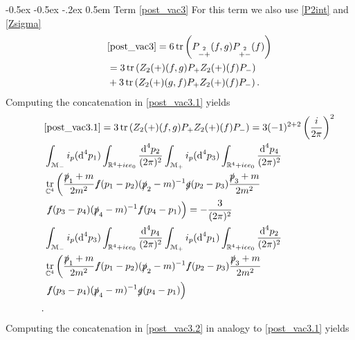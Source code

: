 \documentclass[oneside,reqno,12pt]{amsart}
\makeatletter
\DeclareMathOperator{\tr}{tr}
\renewcommand\subsection{\@startsection {subsection}{1}{\z@}%
                                   {-0.5ex \@plus -0.5ex \@minus -.2ex}%
                                   {0.5em}%
                                   {\normalfont\bfseries}}
\makeatother
\begin{document}
\subsection{Term \eqref{post_vac3}}
For this term we also use \eqref{P2int} and \eqref{Zsigma}
\begin{align}\tag*{}
&\eqref{post_vac3}
=6 \tr\left(P_{\stackrel{2}{-+}}(f,g) P_{\stackrel{2}{+-}}(f)\right)\\\label{post_vac3.1}
&=3 \tr\left(Z_{2}(+)(f,g) P_+ Z_{2}(+)(f) P_-\right)\\\label{post_vac3.2}
&+3 \tr\left(Z_{2}(+)(g,f)P_+ Z_{2}(+)(f) P_-\right)
.\end{align}
 Computing the concatenation in \eqref{post_vac3.1} yields
\begin{align*}
&\eqref{post_vac3.1}=3 \tr\left(Z_{2}(+)(f,g) P_+ Z_{2}(+)(f) P_-\right)
=3(-1)^{2+2}\left(\frac{i}{2\pi}\right)^2\\
&  \int_{\mathcal{M}_-}  i_p(\text{d}^4p_{1})
\int_{\mathbb{R}^4+i \epsilon e_0}\frac{\text{d}^4p_2}{(2\pi)^{2}} 
\int_{\mathcal{M}_+}  i_p(\text{d}^4p_{3})
\int_{\mathbb{R}^4+i\epsilon e_0}\frac{\text{d}^4p_4}{(2\pi)^{2}}\\\tag*{}
&\tr_{\mathbb{C}^4}\left(\frac{\slashed{p}_1+m}{2m^2}  \slashed{f}(p_{1}-p_2)  (\slashed{p}_2-m)^{-1}  
\slashed{g}(p_{2}-p_{3})
  \frac{\slashed{p}_{3}+m}{2m^2} \right.\\
&\left.\slashed{f}(p_{3}-p_4)  (\slashed{p}_4-m)^{-1}  
\slashed{f}(p_{4}-p_{1})\right)
=-\frac{3}{(2\pi)^2}\\
&  \int_{\mathcal{M}_-}  i_p(\text{d}^4p_{3})
\int_{\mathbb{R}^4+i \epsilon e_0}\frac{\text{d}^4p_4}{(2\pi)^{2}} 
\int_{\mathcal{M}_+}  i_p(\text{d}^4p_{1})
\int_{\mathbb{R}^4+i\epsilon e_0}\frac{\text{d}^4p_2}{(2\pi)^{2}}\\\tag*{}
&\tr_{\mathbb{C}^4}
\left(    \frac{\slashed{p}_{1}+m}{2m^2} \slashed{f}(p_{1}-p_2)  (\slashed{p}_2-m)^{-1}   \slashed{f}(p_{2}-p_{3})   \frac{\slashed{p}_3+m}{2m^2}  
   \right.\\
&\left.  \slashed{f}(p_{3}-p_4)  (\slashed{p}_4-m)^{-1}  
\slashed{g}(p_{4}-p_{1}) \right)\\
.\end{align*}
 Computing the concatenation in \eqref{post_vac3.2} in analogy to \eqref{post_vac3.1} yields
\end{document}

